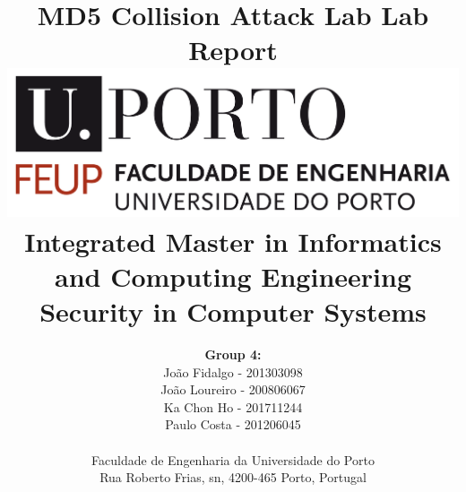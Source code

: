 \documentclass[a4paper]{article}
\begin{document}
\title{\Huge\textbf{MD5 Collision Attack Lab}\linebreak\linebreak\linebreak
\Large\textbf{Lab Report}\linebreak\linebreak
\linebreak\linebreak
\includegraphics[scale=0.1]{feup-logo.png}\linebreak\linebreak
\linebreak\linebreak
\Large{Integrated Master in Informatics and Computing Engineering} \linebreak\linebreak
\Large{Security in Computer Systems}\linebreak
}

\author{\textbf{Group 4:}\\
João Fidalgo - 201303098 \\
João Loureiro - 200806067 \\
Ka Chon Ho - 201711244 \\
Paulo Costa - 201206045 \\
\linebreak\linebreak
 \\ Faculdade de Engenharia da Universidade do Porto \\ Rua Roberto Frias, s\/n, 4200-465 Porto, Portugal \linebreak\linebreak\linebreak
\linebreak\linebreak\vspace{1cm}}

\maketitle
\end{document}
